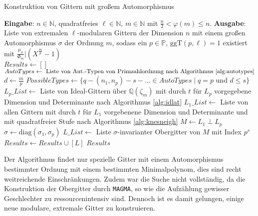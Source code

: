 \documentclass[12pt,a4paper,halfparskip,headsepline,bibtotocnumbered]{scrreprt}
\theoremstyle{nummermitklammern}
\theoremstyle{nonumberbreak}
\newcommand{\N}{\mathbb{N}}
\newcommand{\Q}{\mathbb{Q}}
\renewcommand{\P}{\mathbb{P}}
\newcommand{\ggT}{\text{ggT}}
\begin{document}
\begin{algorithm}[H]
	\caption{Konstruktion von Gittern mit großem Automorphismus}\label{alg:largeauto}
	\begin{algorithmic}[1]
		\State \textbf{Eingabe}: $n \in \N$, quadratfreies $\ell \in \N$, $m \in \N$ mit $\frac{n}{2} < \varphi(m) \leq n$.
		\State \textbf{Ausgabe}: Liste von extremalen $\ell$-modularen Gittern der Dimension $n$ mit einem großen Automorphismus $\sigma$ der Ordnung $m$, sodass ein $p \in \P$, $\ggT(p, \ell) = 1$ existiert mit $\frac{\mu_\sigma}{\Phi_m} \vert (X^\frac{m}{p}-1)$
		\\
		\State $Results \gets []$
		\State $AutoTypes \gets \text{ Liste von Aut.-Typen von Primzahlordnung nach Algorithmus \eqref{alg:autotypes}}$
		\For {$p \in \lbrace q \in \P \mid q \vert m, \ggT(q, \ell) > 1 \rbrace$}
			\State $d \gets \frac{m}{p}$
			\State $PossibleTypes \gets \lbrace q - (n_1, n_p) - s - \dots \in AutoTypes \mid q = p$ und $d \leq s \rbrace$
				\State $L_p\_List \gets$ Liste von Ideal-Gittern über $\Q(\zeta_m)$ mit durch $t$ für $L_p$ vorgegebene Dimension und Determinante nach Algorithmus \eqref{alg:idlat}
						\State $L_1\_List \gets$ Liste von allen Gittern mit durch $t$ für $L_1$ vorgebenene Dimension und Determinante und mit quadratfreier Stufe nach Algorithmus \eqref{alg:knesneigh}
								\State $M \gets L_1 \perp L_p$
								\State $\sigma \gets \text{diag}(\sigma_1, \sigma_p)$
								\State $L\_List \gets$ Liste $\sigma$-invarianter Obergitter von $M$ mit Index $p^s$
										\State $Results \gets Results \cup [L]$							
									\EndIf
								\EndFor
							\EndFor
						\EndFor
					\EndFor
				\EndFor
			\EndFor
		\EndFor
		\State \Return $Results$
	\end{algorithmic}
\end{algorithm}

Der Algorithmus findet nur spezielle Gitter mit einem Automorphismus bestimmter Ordnung mit einem bestimmten Minimalpolynom, dies sind recht weitreichende Einschränkungen. Zudem war die Suche nicht vollständig, da die Konstruktion der Obergitter durch \texttt{MAGMA}, so wie die Aufzählung gewisser Geschlechter zu ressourcenintensiv sind. Dennoch ist es damit gelungen, einige neue modulare, extremale Gitter zu konstruieren.
\end{document}
